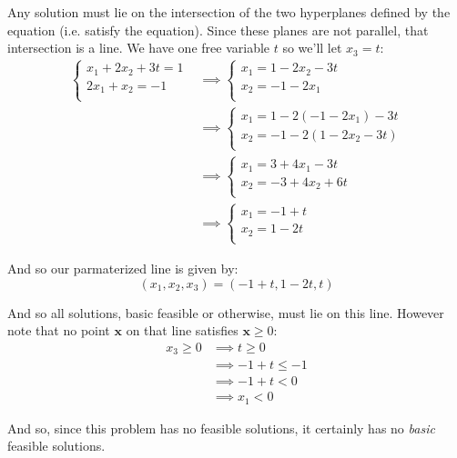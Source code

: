 \documentclass{article}
\renewcommand\vec{\mathbf}
\begin{document}
Any solution must lie on the intersection of the two hyperplanes defined by the equation (i.e. satisfy the equation). Since these planes are not parallel, that intersection is a line. We have one free variable $t$ so we'll let $x_3=t$:
\begin{align*}
    \begin{cases}
        x_1+2x_2+3t=1\\
        2x_1+x_2=-1\\
    \end{cases}
    &\implies
    \begin{cases}
        x_1=1-2x_2-3t\\
        x_2=-1-2x_1\\
    \end{cases}\\
    &\implies
    \begin{cases}
        x_1=1-2(-1-2x_1)-3t\\
        x_2=-1-2(1-2x_2-3t)\\
    \end{cases}\\
    &\implies
    \begin{cases}
        x_1=3+4x_1-3t\\
        x_2=-3+4x_2+6t\\
    \end{cases}\\
    &\implies
    \begin{cases}
        x_1=-1+t\\
        x_2=1-2t\\
    \end{cases}
\end{align*}

And so our parmaterized line is given by:
\begin{equation*}
    (x_1,x_2,x_3)=(-1+t,1-2t,t)
\end{equation*}

And so all solutions, basic feasible or otherwise, must lie on this line. However note that no point $\vec x$ on that line satisfies $\vec x\ge 0$:
\begin{align*}
    x_3\ge 0&\implies t\ge 0\tag{def. of $x_3$}\\
    &\implies -1+t\le -1\\
    &\implies -1+t<0\tag{$-1<0$}\\
    &\implies x_1<0\tag{def. of $x_1$}
\end{align*}

And so, since this problem has no feasible solutions, it certainly has no \textit{basic} feasible solutions.
\end{document}
